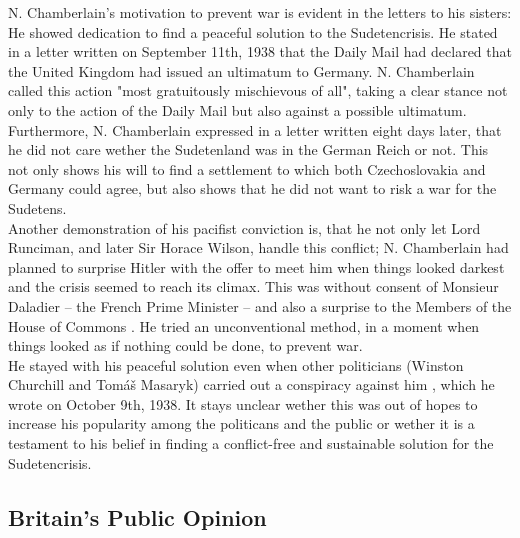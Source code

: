 \documentclass[10pt, a4papert, hidelinks]{article}
\begin{document}
N. Chamberlain's motivation to prevent war is evident in the letters to his sisters: He showed dedication to find a peaceful solution to the Sudetencrisis. He stated in a letter written on September 11th, 1938 that the Daily Mail had declared that the United Kingdom had issued an ultimatum to Germany. N. Chamberlain called this action "most gratuitously mischievous of all", taking a clear stance not only to the action of the Daily Mail but also against a possible ultimatum.\\
Furthermore, N. Chamberlain expressed in a letter written eight days later, that he did not care wether the Sudetenland was in the German Reich or not. This not only shows his will to find a settlement to which both Czechoslovakia and Germany could agree, but also shows that he did not want to risk a war for the Sudetens.\\
Another demonstration of his pacifist conviction is, that he not only let Lord Runciman, and later Sir Horace Wilson, handle this conflict; N. Chamberlain had planned to surprise Hitler with the offer to meet him when things looked darkest and the crisis seemed to reach its climax. This was without consent of Monsieur Daladier -- the French Prime Minister -- and also a surprise to the Members of the House of Commons \cite{voelkerbund_muenchener_abkommen_hermann_raschhofer}. He tried an unconventional method, in a moment when things looked as if nothing could be done, to prevent war.\\
He stayed with his peaceful solution even when other politicians (Winston Churchill and Tomáš Masaryk) carried out a conspiracy against him \cite{chamberlain_neville_2000}, which he wrote on October 9th, 1938. It stays unclear wether this was out of hopes to increase his popularity among the politicans and the public or wether it is a testament to his belief in finding a conflict-free and sustainable solution for the Sudetencrisis.


\subsection{Britain's Public Opinion} %

\end{document}
